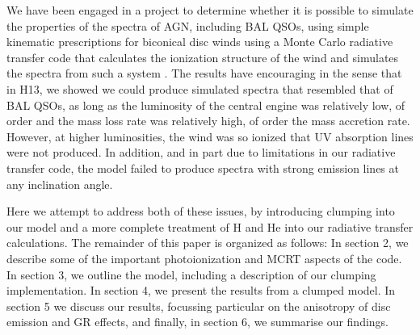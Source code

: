 \documentclass[useAMS,usenatbib]{mn2e_x}
\begin{document}

We have been engaged in a project to determine whether it is possible to simulate the properties of the spectra of AGN, including BAL QSOs, using simple kinematic prescriptions for biconical disc winds using a Monte Carlo radiative transfer code that calculates the ionization structure of the wind and simulates the spectra from such a system \citep[][hereafter H13]{simlong2008,sim2010,higginbottom2013}.   The results have encouraging in the sense that in H13, we showed we could produce simulated spectra that resembled that of BAL QSOs, as long as the luminosity of the central engine was relatively low, of order  and the mass loss rate was relatively high, of order the mass accretion rate.  However, at higher luminosities, the wind was so ionized that UV absorption lines were not produced.  In addition, and in part due to limitations in our radiative transfer code, the model failed to produce spectra with strong emission lines at any inclination angle.  

Here we attempt to address both of these issues, by introducing clumping into our model and a more complete treatment of H and He into our radiative transfer calculations.   The remainder of this paper is organized as follows:
In section 2, we describe some of the important photoionization 
and MCRT aspects of the code. In section 3, we outline the model, including 
a description of our clumping implementation. In section 4, we present the results 
from a clumped model. In section 5 we discuss our results, 
focussing particular on the anisotropy of 
disc emission and GR effects, and finally, in section 6, we summarise our findings.
\end{document}
